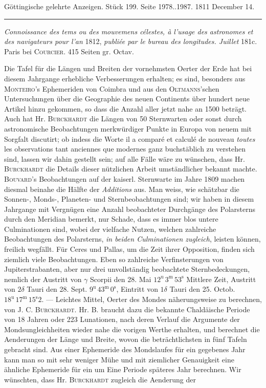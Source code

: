 \clearpage
{}
\hypertarget{native-542-lower}{}\label{native-542-lower}
\begin{center}\small Göttingische gelehrte Anzeigen. Stück 199. Seite 1978..1987. 1811 December 14.\\[3pt]\rule{.72\linewidth}{.3pt}\end{center}

\emph{Connoissance des tems ou des mouvemens célestes, à l'usage des astronomes et des navigateurs pour l'an} 1812, \emph{publiée par le bureau des longitudes. Juillet} 181c. Paris bei \textsc{Courcier}. 415 Seiten gr. Octav.

Die Tafel für die Längen und Breiten der vornehmsten Oerter der Erde hat bei diesem Jahrgange erhebliche Verbesserungen erhalten; es sind, besonders aus \textsc{Monteiro}'s Ephemeriden von Coimbra und aus den \textsc{Oltmanns}'schen Untersuchungen über die Geographie des neuen Continents über hundert neue Artikel hinzu gekommen, so dass die Anzahl aller jetzt nahe an 1500 beträgt. Auch hat Hr. \textsc{Burckhardt} die Längen von 50 Sternwarten oder sonst durch astronomische Beobachtungen merkwürdiger Punkte in Europa von neuem mit Sorgfalt discutirt; ob indess die Worte il a comparé et calculé de nouveau \emph{toutes} les observations tant anciennes que modernes ganz buchstäblich zu verstehen sind, lassen wir dahin gestellt sein; auf alle Fälle wäre zu wünschen, dass Hr. \textsc{Burckhardt} die Details dieser nützlichen Arbeit umständlicher bekannt machte. \textsc{Bouvard}'s Beobachtungen auf der kaiserl. Sternwarte im Jahre 1809 machen diesmal beinahe die Hälfte der \emph{Additions} aus. Man weiss, wie schätzbar die Sonnen-, Monds-, Planeten- und Sternbeobachtungen sind; wir haben in diesem Jahrgange mit Vergnügen eine Anzahl beobachteter Durchgänge des Polarsterns durch den Meridian bemerkt, nur Schade, dass es immer blos untere Culminationen sind, wobei der vielfache Nutzen, welchen zahlreiche Beobachtungen des Polarsterns, \emph{in beiden Culminationen zugleich}, leisten können, freilich wegfällt. Für Ceres und Pallas, um die Zeit ihrer Opposition, finden sich ziemlich viele Beobachtungen. Eben so zahlreiche Verfinsterungen von Jupiterstrabanten, aber nur drei unvollständig beobachtete Sternbedeckungen, nemlich der Austritt von $\gamma$ Scorpii den 28. Mai $12^{\mathrm u}\,3^{\mathrm m}\,53^{\mathrm s}$ Mittlere Zeit, Austritt von $2\delta$ Tauri den 28. Sept. $9^{\mathrm u}\,43^{\mathrm m}\,0^{\mathrm s}$, Eintritt von $1\delta$ Tauri den 25. Octob. $18^{\mathrm u}\,17^{\mathrm m}\,15^{\mathrm s}2$. --- Leichtes Mittel, Oerter des Mondes näherungsweise zu berechnen, von J. C. \textsc{Burckhardt}. Hr. B. braucht dazu die bekannte Chaldäische Periode von 18 Jahren oder 223 Lunationen, nach deren Verlauf die Argumente der Mondsungleichheiten wieder nahe die vorigen Werthe erhalten, und berechnet die Aenderungen der Länge und Breite, wovon die beträchtlichsten in fünf Tafeln gebracht sind. Aus einer Ephemeride des Mondslaufes für ein gegebenes Jahr kann man so mit sehr weniger Mühe und mit ziemlicher Genauigkeit eine ähnliche Ephemeride für ein um Eine Periode späteres Jahr berechnen. Wir wünschten, dass Hr. \textsc{Burckhardt} zugleich die Aenderung der 